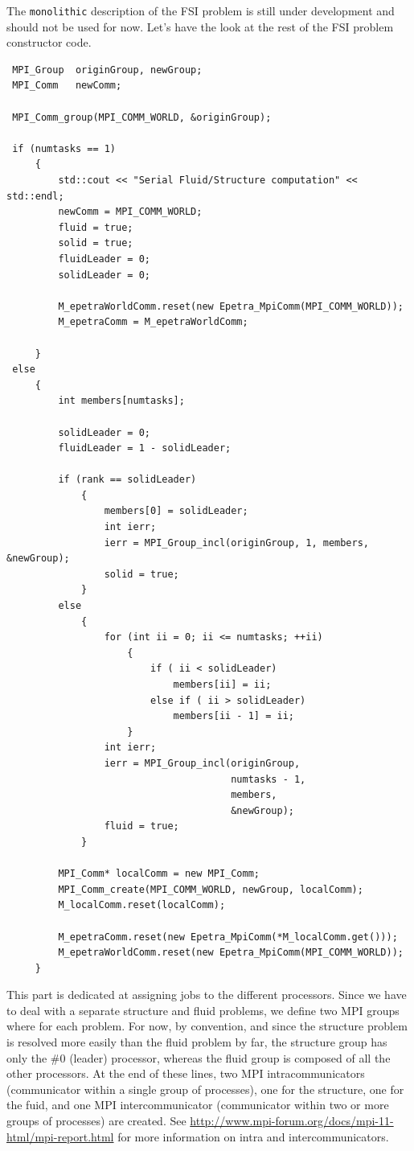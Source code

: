 The \verb!monolithic! description of the FSI problem is still under  development and
should not be used for now. Let's have the look at the rest of the FSI problem constructor code.

\begin{verbatim}
 MPI_Group  originGroup, newGroup;
 MPI_Comm   newComm;

 MPI_Comm_group(MPI_COMM_WORLD, &originGroup);

 if (numtasks == 1)
     {
         std::cout << "Serial Fluid/Structure computation" << std::endl;
         newComm = MPI_COMM_WORLD;
         fluid = true;
         solid = true;
         fluidLeader = 0;
         solidLeader = 0;

         M_epetraWorldComm.reset(new Epetra_MpiComm(MPI_COMM_WORLD));
         M_epetraComm = M_epetraWorldComm;

     }
 else
     {
         int members[numtasks];

         solidLeader = 0;
         fluidLeader = 1 - solidLeader;

         if (rank == solidLeader)
             {
                 members[0] = solidLeader;
                 int ierr;
                 ierr = MPI_Group_incl(originGroup, 1, members, &newGroup);
                 solid = true;
             }
         else
             {
                 for (int ii = 0; ii <= numtasks; ++ii)
                     {
                         if ( ii < solidLeader)
                             members[ii] = ii;
                         else if ( ii > solidLeader)
                             members[ii - 1] = ii;
                     }
                 int ierr;
                 ierr = MPI_Group_incl(originGroup,
                                       numtasks - 1,
                                       members,
                                       &newGroup);
                 fluid = true;
             }

         MPI_Comm* localComm = new MPI_Comm;
         MPI_Comm_create(MPI_COMM_WORLD, newGroup, localComm);
         M_localComm.reset(localComm);

         M_epetraComm.reset(new Epetra_MpiComm(*M_localComm.get()));
         M_epetraWorldComm.reset(new Epetra_MpiComm(MPI_COMM_WORLD));
     }

\end{verbatim}

This part is dedicated at assigning jobs to the different processors. Since we have to deal
with a separate structure and fluid problems, we define two MPI groups where for each problem.
For now, by convention, and since the structure problem is resolved more easily than the
fluid problem by far, the structure group has only the \#0 (leader) processor, whereas the fluid group is
composed of all the other processors. At the end of these lines, two MPI intracommunicators
(communicator within a single group of processes), one for the structure,
one for the fuid, and one MPI intercommunicator (communicator within two or
more groups of processes) are created. See \url{http://www.mpi-forum.org/docs/mpi-11-html/mpi-report.html}
for more information on intra and intercommunicators.

